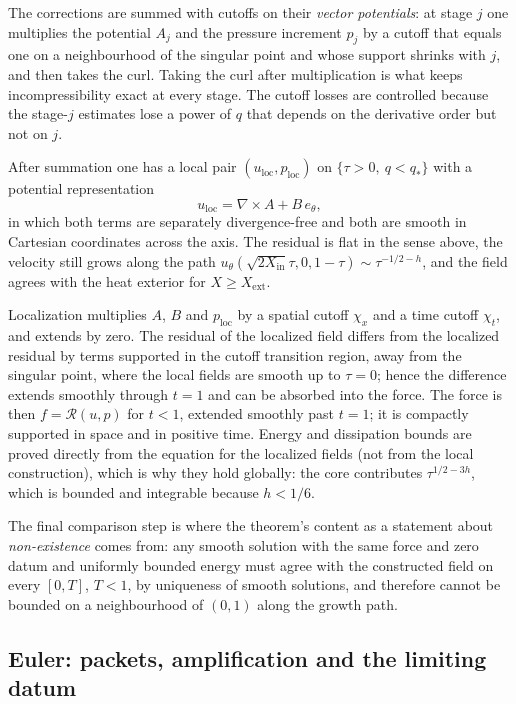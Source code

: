 The corrections are summed with cutoffs on their \emph{vector potentials}: at stage $j$ one
multiplies the potential $A_j$ and the pressure increment $p_j$ by a cutoff that equals one
on a neighbourhood of the singular point and whose support shrinks with $j$, and then takes
the curl. Taking the curl after multiplication is what keeps incompressibility exact at
every stage. The cutoff losses are controlled because the stage-$j$ estimates lose a power
of $q$ that depends on the derivative order but not on $j$.

After summation one has a local pair $(u_{\mathrm{loc}},p_{\mathrm{loc}})$ on
$\{\tau>0,\ q<q_*\}$ with a potential representation
\begin{equation}
  u_{\mathrm{loc}} = \nabla\times A + B\,e_\theta,
  \label{eq:potential}
\end{equation}
in which both terms are separately divergence-free and both are smooth in Cartesian
coordinates across the axis. The residual is flat in the sense above, the velocity still
grows along the path $u_\theta(\sqrt{2X_{\mathrm{in}}}\tau,0,1-\tau)\sim\tau^{-1/2-h}$, and
the field agrees with the heat exterior for $X\ge X_{\mathrm{ext}}$.

Localization multiplies $A$, $B$ and $p_{\mathrm{loc}}$ by a spatial cutoff $\chi_x$ and a
time cutoff $\chi_t$, and extends by zero. The residual of the localized field differs from
the localized residual by terms supported in the cutoff transition region, away from the
singular point, where the local fields are smooth up to $\tau=0$; hence the difference
extends smoothly through $t=1$ and can be absorbed into the force. The force is then
$f=\mathcal{R}(u,p)$ for $t<1$, extended smoothly past $t=1$; it is compactly supported in
space and in positive time. Energy and dissipation bounds are proved directly from the
equation for the localized fields (not from the local construction), which is why they hold
globally: the core contributes $\tau^{1/2-3h}$, which is bounded and integrable because
$h<1/6$.

The final comparison step is where the theorem's content as a statement about
\emph{non-existence} comes from: any smooth solution with the same force and zero datum and
uniformly bounded energy must agree with the constructed field on every $[0,T]$, $T<1$, by
uniqueness of smooth solutions, and therefore cannot be bounded on a neighbourhood of
$(0,1)$ along the growth path.

\subsection{Euler: packets, amplification and the limiting datum}
\label{sec:euler-shape}

